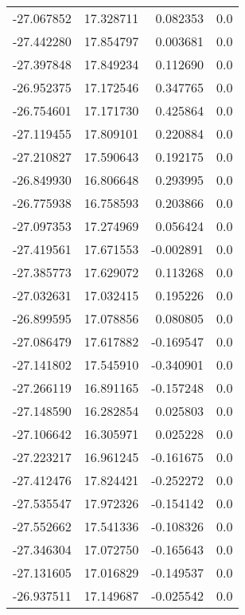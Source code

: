 \begin{tabular}{rrrr}
      -27.067852 &        17.328711 &    0.082353 &   0.0 \\
      -27.442280 &        17.854797 &    0.003681 &   0.0 \\
      -27.397848 &        17.849234 &    0.112690 &   0.0 \\
      -26.952375 &        17.172546 &    0.347765 &   0.0 \\
      -26.754601 &        17.171730 &    0.425864 &   0.0 \\
      -27.119455 &        17.809101 &    0.220884 &   0.0 \\
      -27.210827 &        17.590643 &    0.192175 &   0.0 \\
      -26.849930 &        16.806648 &    0.293995 &   0.0 \\
      -26.775938 &        16.758593 &    0.203866 &   0.0 \\
      -27.097353 &        17.274969 &    0.056424 &   0.0 \\
      -27.419561 &        17.671553 &   -0.002891 &   0.0 \\
      -27.385773 &        17.629072 &    0.113268 &   0.0 \\
      -27.032631 &        17.032415 &    0.195226 &   0.0 \\
      -26.899595 &        17.078856 &    0.080805 &   0.0 \\
      -27.086479 &        17.617882 &   -0.169547 &   0.0 \\
      -27.141802 &        17.545910 &   -0.340901 &   0.0 \\
      -27.266119 &        16.891165 &   -0.157248 &   0.0 \\
      -27.148590 &        16.282854 &    0.025803 &   0.0 \\
      -27.106642 &        16.305971 &    0.025228 &   0.0 \\
      -27.223217 &        16.961245 &   -0.161675 &   0.0 \\
      -27.412476 &        17.824421 &   -0.252272 &   0.0 \\
      -27.535547 &        17.972326 &   -0.154142 &   0.0 \\
      -27.552662 &        17.541336 &   -0.108326 &   0.0 \\
      -27.346304 &        17.072750 &   -0.165643 &   0.0 \\
      -27.131605 &        17.016829 &   -0.149537 &   0.0 \\
      -26.937511 &        17.149687 &   -0.025542 &   0.0 \\

\end{tabular}

